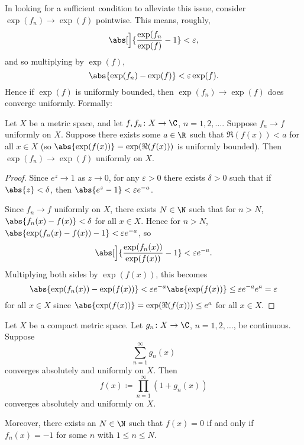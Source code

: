 In looking for a sufficient condition to alleviate this issue, consider $\exp(f_n) \to \exp(f)$ pointwise.
This means, roughly,
\[
	\abs[\Big]{\frac{\exp(f_n}{\exp(f)} - 1} < \varepsilon,
\]
and so multiplying by $\exp(f)$,
\[
	\abs{\exp(f_n) - \exp(f)} < \varepsilon \exp(f).
\]
Hence if $\exp(f)$ is uniformly bounded, then $\exp(f_n) \to \exp(f)$ does converge uniformly.
Formally:

\begin{lemma}\label{lem8.3}
	Let $X$ be a metric space, and let $f, f_n \colon X \to \C$, $n = 1, 2, \dots$.
	Suppose $f_n \to f$ uniformly on $X$.
	Suppose there exists some $a \in \R$ such that $\Re(f(x)) < a$ for all $x \in X$ (so $\abs{\exp(f(x))} = \exp(\Re(f(x)))$ is uniformly bounded).
	Then $\exp(f_n) \to \exp(f)$ uniformly on $X$.
\end{lemma}

\begin{proof}
	Since $e^z \to 1$ as $z \to 0$, for any $\varepsilon > 0$ there exists $\delta > 0$ such that if $\abs{z} < \delta$, then $\abs{e^z - 1} < \varepsilon e^{-a}$.

	Since $f_n \to f$ uniformly on $X$, there exists $N \in \N$ such that for $n > N$, $\abs{f_n(x) - f(x)} < \delta$ for all $x \in X$.
	Hence for $n > N$, $\abs{\exp(f_n(x) - f(x)) - 1} < \varepsilon e^{-a}$, so
	\[
		\abs[\Big]{\frac{\exp(f_n(x))}{\exp(f(x))} - 1} < \varepsilon e^{-a}.
	\]
	Multiplying both sides by $\exp(f(x))$, this becomes
	\[
		\abs{\exp(f_n(x)) - \exp(f(x))} < \varepsilon e^{-a} \abs{\exp(f(x))} \leq \varepsilon e^{-a} e^a = \varepsilon
	\]
	for all $x \in X$ since $\abs{\exp(f(x))} = \exp(\Re(f(x))) \leq e^a$ for all $x \in X$.
\end{proof}

\begin{lemma}\label{lem8.4}
	Let $X$ be a compact metric space.
	Let $g_n \colon X \to \C$, $n = 1, 2, \dots$, be continuous.
	Suppose
	\[
		\sum_{n = 1}^\infty g_n(x)
	\]
	converges absolutely and uniformly on $X$.
	Then
	\[
		f(x) \coloneqq \prod_{n = 1}^\infty (1 + g_n(x))
	\]
	converges absolutely and uniformly on $X$.

	Moreover, there exists an $N \in \N$ such that $f(x) = 0$ if and only if $f_n(x) = -1$ for some $n$ with $1 \leq n \leq N$.
\end{lemma}

